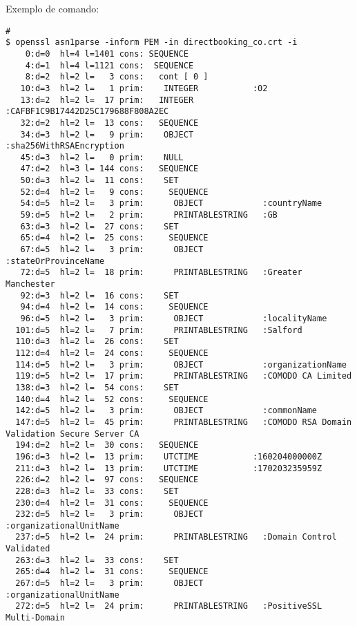 \documentclass[a4paper,11pt]{article}
\theoremstyle{mytheor}
\begin{document}
\noindent Exemplo de comando:
\begin{lstlisting}
# 
$ openssl asn1parse -inform PEM -in directbooking_co.crt -i
    0:d=0  hl=4 l=1401 cons: SEQUENCE          
    4:d=1  hl=4 l=1121 cons:  SEQUENCE          
    8:d=2  hl=2 l=   3 cons:   cont [ 0 ]        
   10:d=3  hl=2 l=   1 prim:    INTEGER           :02
   13:d=2  hl=2 l=  17 prim:   INTEGER           :CAFBF1C9B17442D25C179688F808A2EC
   32:d=2  hl=2 l=  13 cons:   SEQUENCE          
   34:d=3  hl=2 l=   9 prim:    OBJECT            :sha256WithRSAEncryption
   45:d=3  hl=2 l=   0 prim:    NULL              
   47:d=2  hl=3 l= 144 cons:   SEQUENCE          
   50:d=3  hl=2 l=  11 cons:    SET               
   52:d=4  hl=2 l=   9 cons:     SEQUENCE          
   54:d=5  hl=2 l=   3 prim:      OBJECT            :countryName
   59:d=5  hl=2 l=   2 prim:      PRINTABLESTRING   :GB
   63:d=3  hl=2 l=  27 cons:    SET               
   65:d=4  hl=2 l=  25 cons:     SEQUENCE          
   67:d=5  hl=2 l=   3 prim:      OBJECT            :stateOrProvinceName
   72:d=5  hl=2 l=  18 prim:      PRINTABLESTRING   :Greater Manchester
   92:d=3  hl=2 l=  16 cons:    SET               
   94:d=4  hl=2 l=  14 cons:     SEQUENCE          
   96:d=5  hl=2 l=   3 prim:      OBJECT            :localityName
  101:d=5  hl=2 l=   7 prim:      PRINTABLESTRING   :Salford
  110:d=3  hl=2 l=  26 cons:    SET               
  112:d=4  hl=2 l=  24 cons:     SEQUENCE          
  114:d=5  hl=2 l=   3 prim:      OBJECT            :organizationName
  119:d=5  hl=2 l=  17 prim:      PRINTABLESTRING   :COMODO CA Limited
  138:d=3  hl=2 l=  54 cons:    SET               
  140:d=4  hl=2 l=  52 cons:     SEQUENCE          
  142:d=5  hl=2 l=   3 prim:      OBJECT            :commonName
  147:d=5  hl=2 l=  45 prim:      PRINTABLESTRING   :COMODO RSA Domain Validation Secure Server CA
  194:d=2  hl=2 l=  30 cons:   SEQUENCE          
  196:d=3  hl=2 l=  13 prim:    UTCTIME           :160204000000Z
  211:d=3  hl=2 l=  13 prim:    UTCTIME           :170203235959Z
  226:d=2  hl=2 l=  97 cons:   SEQUENCE          
  228:d=3  hl=2 l=  33 cons:    SET               
  230:d=4  hl=2 l=  31 cons:     SEQUENCE          
  232:d=5  hl=2 l=   3 prim:      OBJECT            :organizationalUnitName
  237:d=5  hl=2 l=  24 prim:      PRINTABLESTRING   :Domain Control Validated
  263:d=3  hl=2 l=  33 cons:    SET               
  265:d=4  hl=2 l=  31 cons:     SEQUENCE          
  267:d=5  hl=2 l=   3 prim:      OBJECT            :organizationalUnitName
  272:d=5  hl=2 l=  24 prim:      PRINTABLESTRING   :PositiveSSL Multi-Domain

\end{lstlisting}
\end{document}
